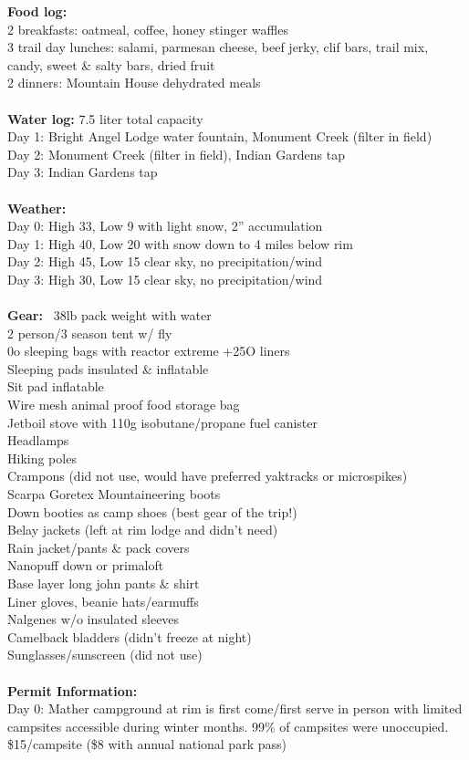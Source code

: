 \documentclass[10pt,a4paper]{article}
\begin{document}
\begin{multicols}{2}
\textbf{Food log: }\\
2 breakfasts: oatmeal, coffee, honey stinger waffles\\
	3 trail day lunches: salami, parmesan cheese, beef jerky, clif bars, trail mix, candy, sweet \& salty bars, dried fruit\\
	2 dinners: Mountain House dehydrated meals
\\
\\
\textbf{Water log:} 7.5 liter total capacity\\
	Day 1: Bright Angel Lodge water fountain, Monument Creek (filter in field)\\
	Day 2: Monument Creek (filter in field), Indian Gardens tap\\
	Day 3: Indian Gardens tap
\\
\\
\textbf{Weather:}\\
	Day 0: High 33, Low 9 with light snow, 2” accumulation\\
	Day 1: High 40, Low 20 with snow down to 4 miles below rim\\
	Day 2: High 45, Low 15 clear sky, no precipitation/wind\\
	Day 3: High 30, Low 15 clear sky, no precipitation/wind
\\
\\
\textbf{Gear:} ~38lb pack weight with water\\
	2 person/3 season tent w/ fly \\
0o sleeping bags with reactor extreme +25O liners\\
	Sleeping pads insulated \& inflatable\\
	Sit pad inflatable \\
Wire mesh animal proof food storage bag\\
	Jetboil stove with 110g isobutane/propane fuel canister\\
	Headlamps \\
Hiking poles\\
	Crampons (did not use, would have preferred yaktracks or microspikes)\\
	Scarpa Goretex Mountaineering boots\\
	Down booties as camp shoes (best gear of the trip!)\\
	Belay jackets (left at rim lodge and didn't need)\\
	Rain jacket/pants \& pack covers	\\
	Nanopuff down or primaloft\\
	Base layer long john pants \& shirt\\
	Liner gloves, beanie hats/earmuffs\\
	Nalgenes w/o insulated sleeves\\
	Camelback bladders (didn't freeze at night)\\
	Sunglasses/sunscreen (did not use)
\\
\\	
\textbf{Permit Information: }\\
Day 0: Mather campground at rim is first come/first serve in person with limited campsites accessible during winter months. 99\% of campsites were unoccupied. \$15/campsite (\$8 with annual national park pass)


\end{multicols}
\end{document}
